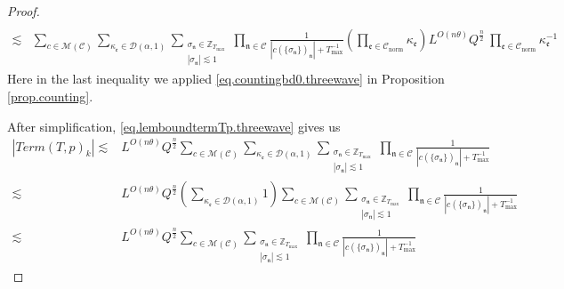 \begin{proof}
\begin{equation}
\begin{split}
    \\
    \lesssim &\sum_{c\in \mathscr{M}(\mathcal{C}) }\sum_{\kappa_{\mathfrak{e}}\in \mathcal{D}(\alpha,1)}\sum_{\substack{\sigma_{\mathfrak{n}}\in \mathbb{Z}_{T_{\text{max}}}\\ |\sigma_{\mathfrak{n}}|\lesssim 1}}\prod_{\mathfrak{n}\in \mathcal{C}}\frac{1}{|c(\{\sigma_{\mathfrak{n}}\})_{\mathfrak{n}}|+T^{-1}_{\text{max}}} \left(\prod_{\mathfrak{e}\in \mathcal{C}_{\text{norm}}}\kappa_{\mathfrak{e}}\right)L^{O(n\theta)} Q^{\frac{n}{2}}\ \prod_{\mathfrak{e}\in \mathcal{C}_{\text{norm}}} \kappa^{-1}_{\mathfrak{e}}
\end{split}
\end{equation}
Here in the last inequality we applied \eqref{eq.countingbd0.threewave} in Proposition \ref{prop.counting}.

After simplification, \eqref{eq.lemboundtermTp.threewave} gives us 
\begin{equation}\label{eq.lemboundtermTpsimplify.threewave}
\begin{split}
    |Term(T, p)_k|\lesssim &L^{O(n\theta)} Q^{\frac{n}{2}}\sum_{c\in \mathscr{M}(\mathcal{C}) }\sum_{\kappa_{\mathfrak{e}}\in \mathcal{D}(\alpha,1)}\sum_{\substack{\sigma_{\mathfrak{n}}\in \mathbb{Z}_{T_{\text{max}}}\\ |\sigma_{\mathfrak{n}}|\lesssim 1}} \prod_{\mathfrak{n}\in \mathcal{C}}\frac{1}{|c(\{\sigma_{\mathfrak{n}}\})_{\mathfrak{n}}|+T^{-1}_{\text{max}}}
    \\
    \lesssim &L^{O(n\theta)} Q^{\frac{n}{2}} \left(\sum_{\kappa_{\mathfrak{e}}\in \mathcal{D}(\alpha,1)} 1\right) \sum_{c\in \mathscr{M}(\mathcal{C})}\sum_{\substack{\sigma_{\mathfrak{n}}\in \mathbb{Z}_{T_{\text{max}}}\\ |\sigma_{\mathfrak{n}}|\lesssim 1}} \prod_{\mathfrak{n}\in \mathcal{C}}\frac{1}{|c(\{\sigma_{\mathfrak{n}}\})_{\mathfrak{n}}|+T^{-1}_{\text{max}}}
    \\
    \lesssim & L^{O(n\theta)} Q^{\frac{n}{2}} \sum_{c\in \mathscr{M}(\mathcal{C})}\sum_{\substack{\sigma_{\mathfrak{n}}\in \mathbb{Z}_{T_{\text{max}}}\\ |\sigma_{\mathfrak{n}}|\lesssim 1}} \prod_{\mathfrak{n}\in \mathcal{C}}\frac{1}{|c(\{\sigma_{\mathfrak{n}}\})_{\mathfrak{n}}|+T^{-1}_{\text{max}}}
\end{split}
\end{equation}

\end{proof}
